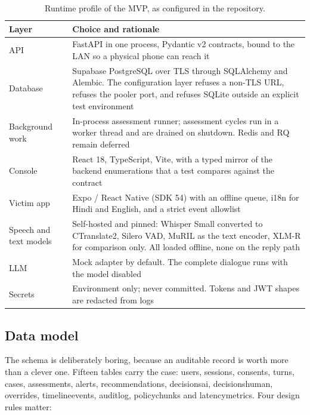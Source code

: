 \documentclass[11pt,a4paper]{article}
\newcommand{\codeus}{\textunderscore\allowbreak}
\DeclareRobustCommand{\code}[1]{{\ttfamily\let\_\codeus #1}}
\begin{document}
\begin{table}[!htbp]
\centering\small
\caption{Runtime profile of the MVP, as configured in the repository.}
\label{tab:runtime}
\begin{tabularx}{\linewidth}{@{}>{\raggedright\arraybackslash}p{3.6cm}X@{}}
\toprule
Layer & Choice and rationale \\
\midrule
API & FastAPI in one process, Pydantic v2 contracts, bound to the LAN so a physical phone can reach it \\
Database & Supabase PostgreSQL over TLS through SQLAlchemy and Alembic. The configuration layer
refuses a non-TLS URL, refuses the pooler port, and refuses SQLite outside an explicit test
environment \\
Background work & In-process assessment runner; assessment cycles run in a worker thread and are
drained on shutdown. Redis and RQ remain deferred \\
Console & React 18, TypeScript, Vite, with a typed mirror of the backend enumerations that a test
compares against the contract \\
Victim app & Expo / React Native (SDK 54) with an offline queue, i18n for Hindi and English, and a
strict event allowlist \\
Speech and text models & Self-hosted and pinned: Whisper Small converted to CTranslate2, Silero VAD,
MuRIL as the text encoder, XLM-R for comparison only. All loaded offline, none on the reply path \\
LLM & Mock adapter by default. The complete dialogue runs with the model disabled \\
Secrets & Environment only; never committed. Tokens and JWT shapes are redacted from logs \\
\bottomrule
\end{tabularx}
\end{table}

\subsection{Data model}
The schema is deliberately boring, because an auditable record is worth more than a clever one.
Fifteen tables carry the case: \code{users}, \code{sessions}, \code{consents}, \code{turns},
\code{cases}, \code{assessments}, \code{alerts}, \code{recommendations}, \code{decisions\_ai},
\code{decisions\_human}, \code{overrides}, \code{timeline\_events}, \code{audit\_log},
\code{policy\_chunks} and \code{latency\_metrics}. Four design rules matter:
\end{document}

